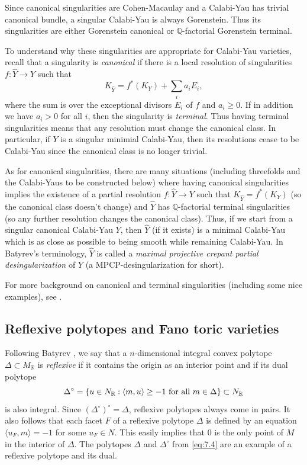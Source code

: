 \documentclass{amsart}
\theoremstyle{plain}
\theoremstyle{definition}
\begin{document}
	Since canonical singularities are Cohen-Macaulay and a
Calabi-Yau has trivial canonical bundle, a singular Calabi-Yau is
always Gorenstein.  Thus its singularities are either Gorenstein
canonical or $\mathbb{Q}$-factorial Gorenstein terminal.

	To understand why these singularities are appropriate for
Calabi-Yau varieties, recall that a singularity is {\it canonical\/}
if there is a local resolution of singularities $f : \widehat Y \to Y$
such that
\[
K_{\widehat Y} = f^*(K_Y) + \sum_i a_i E_i,
\]
where the sum is over the exceptional divisors $E_i$ of $f$ and $a_i
\ge 0$.  If in addition we have $a_i > 0$ for all $i$, then the
singularity is {\it terminal\/}.  Thus having terminal singularities
means that any resolution must change the canonical class.  In
particular, if $Y$ is a singular minimial Calabi-Yau, then its
resolutions cease to be Calabi-Yau since the canonical class is no
longer trivial.

	As for canonical singularities, there are many situations
(including threefolds and the Calabi-Yaus to be constructed below)
where having canonical singularities implies the existence of a
partial resolution $f: \widehat Y \to Y$ such that $K_{\widehat Y} =
f^*(K_Y)$ (so the canonical class doesn't change) and $\widehat Y$ has
$\mathbb{Q}$-factorial terminal singularities (so any further resolution
changes the canonical class).  Thus, if we start from a singular
canonical Calabi-Yau $Y$, then $\widehat Y$ (if it exists) is a
minimal Calabi-Yau which is as close as possible to being smooth while
remaining Calabi-Yau.  In Batyrev's terminology, $\widehat Y$ is
called a {\it maximal projective crepant partial desingularization\/}
of $Y$ (a MPCP-desingularization for short).

	For more background on canonical and terminal singularities
(including some nice examples), see \cite{Rei5}.

	\subsection{Reflexive polytopes and Fano toric varieties} Following Batyrev \cite{Bat1}, we say that a
$n$-dimensional integral convex polytope $\Delta \subset M_\mathbb{R}$
is {\it reflexive\/} if it contains the origin as an interior point
and if its dual polytope
\[
\Delta^\circ = \{u \in N_\mathbb{R} : \langle m,u\rangle \ge -1\
\hbox{for all}\ m \in \Delta\} \subset N_\mathbb{R}
\]
is also integral.  Since $(\Delta^\circ)^\circ = \Delta$, reflexive
polytopes always come in pairs.  It also follows that each facet $F$
of a reflexive polytope $\Delta$ is defined by an equation $\langle
u_F,m\rangle = -1$ for some $u_F \in N$.  This easily implies that $0$
is the only point of $M$ in the interior of $\Delta$.  The polytopes
$\Delta$ and $\Delta^\circ$ from \eqref{eq:7.4} are an example of a
reflexive polytope and its dual.
\end{document}
